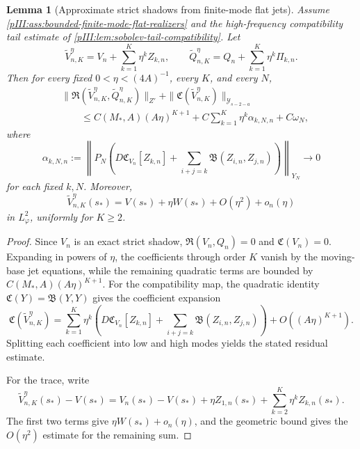 \documentclass[11pt]{article}
\numberwithin{equation}{section}
\theoremstyle{plain}
\newtheorem{lemma}{Lemma}[section]
\theoremstyle{definition}
\theoremstyle{remark}
\newcommand{\calB}{\mathfrak B}
\newcommand{\calC}{\mathfrak C}
\newcommand{\calY}{\mathcal Y}
\begin{document}
\begin{lemma}[Approximate strict shadows from finite-mode flat jets]
\label{pIII:lem:approximate-shadows-from-flat-jets}
Assume \cref{pIII:ass:bounded-finite-mode-flat-realizers} and the high-frequency compatibility tail
estimate of \cref{pIII:lem:sobolev-tail-compatibility}.  Let
\[
        \widetilde V_{n,K}^\eta
        =
        V_n+\sum_{k=1}^K\eta^kZ_{k,n},
        \qquad
        \widetilde Q_{n,K}^\eta
        =
        Q_n+\sum_{k=1}^K\eta^k\Pi_{k,n}.
\]
Then for every fixed \(0<\eta<(4A)^{-1}\), every \(K\), and every \(N\),
\[
\begin{aligned}
        &\|\mathfrak R(\widetilde V_{n,K}^\eta,\widetilde Q_{n,K}^\eta)\|_{Z'}
        +
        \|\calC(\widetilde V_{n,K}^\eta)\|_{\calY_{s-2-a}} \\
        &\qquad\le
        C(M_*,A)(A\eta)^{K+1}
        +
        C\sum_{k=1}^K\eta^k\alpha_{k,N,n}
        +
        C\omega_N,
\end{aligned}
\]
where
\[
        \alpha_{k,N,n}
        :=
        \left\|
        P_N
        \left(
        D\calC_{V_n}[Z_{k,n}]
        +
        \sum_{i+j=k}\calB(Z_{i,n},Z_{j,n})
        \right)
        \right\|_{Y_N}\to0
\]
for each fixed \(k,N\).  Moreover,
\[
        \widetilde V_{n,K}^\eta(s_*)
        =
        V(s_*)+\eta W(s_*)+O(\eta^2)+o_n(\eta)
\]
in \(L^2_\varphi\), uniformly for \(K\ge2\).
\end{lemma}

\begin{proof}
Since \(V_n\) is an exact strict shadow, \(\mathfrak R(V_n,Q_n)=0\) and \(\calC(V_n)=0\).  Expanding
in powers of \(\eta\), the coefficients through order \(K\) vanish by the moving-base jet equations,
while the remaining quadratic terms are bounded by \(C(M_*,A)(A\eta)^{K+1}\).  For the
compatibility map, the quadratic identity \(\calC(Y)=\calB(Y,Y)\) gives the coefficient expansion
\[
        \calC(\widetilde V_{n,K}^\eta)
        =
        \sum_{k=1}^K\eta^k
        \left(
        D\calC_{V_n}[Z_{k,n}]
        +
        \sum_{i+j=k}\calB(Z_{i,n},Z_{j,n})
        \right)
        +
        O((A\eta)^{K+1}).
\]
Splitting each coefficient into low and high modes yields the stated residual estimate.

For the trace, write
\[
        \widetilde V_{n,K}^\eta(s_*)-V(s_*)
        =
        V_n(s_*)-V(s_*)+
        \eta Z_{1,n}(s_*)+
        \sum_{k=2}^K\eta^kZ_{k,n}(s_*).
\]
The first two terms give \(\eta W(s_*)+o_n(\eta)\), and the geometric bound gives the
\(O(\eta^2)\) estimate for the remaining sum.
\end{proof}
\end{document}
